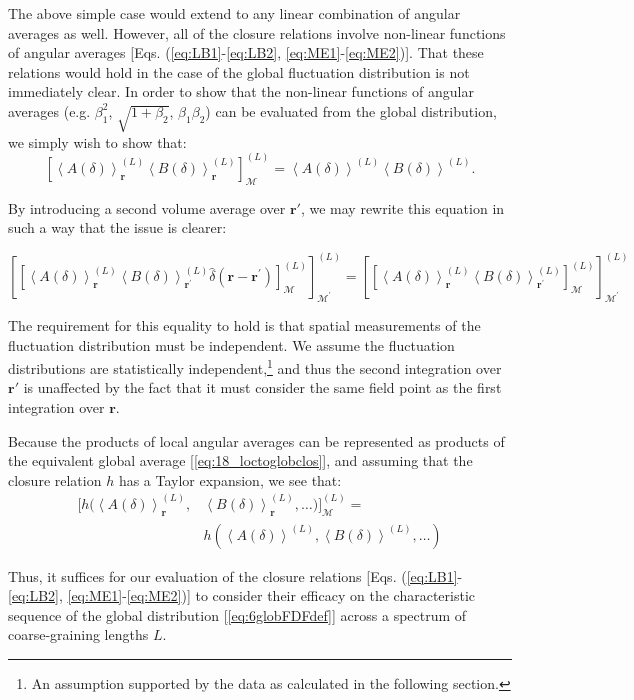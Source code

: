 The above simple case would extend to any linear combination of angular averages as well. However, all of the closure relations involve non-linear functions of angular averages [Eqs. (\ref{eq:LB1}-\ref{eq:LB2}, \ref{eq:ME1}-\ref{eq:ME2})]. That these relations would hold in the case of the global fluctuation distribution is not immediately clear. In order to show that the non-linear functions of angular averages (e.g. \(\beta_{1}^{2}\), \(\sqrt{1 + \beta_{2}}\), \(\beta_{1}\beta_{2}\)) can be evaluated from the global distribution, we simply wish to show that:
\begin{equation}
\left\lbrack \left\langle A(\delta) \right\rangle_{\boldsymbol{r}}^{(L)}\left\langle B(\delta) \right\rangle_{\boldsymbol{r}}^{(L)} \right\rbrack_{\mathcal{M}}^{(L)} = \left\langle A(\delta) \right\rangle^{(L)}\left\langle B(\delta) \right\rangle^{(L)}. \label{eq:18_loctoglobclos}
\end{equation}

By introducing a second volume average over \(\boldsymbol{r}'\), we may rewrite this equation in such a way that the issue is clearer:
\begin{widetext}
\begin{equation}\left\lbrack \left\lbrack \left\langle A(\delta) \right\rangle_{\boldsymbol{r}}^{(L)}\left\langle B(\delta) \right\rangle_{\boldsymbol{r}^{\boldsymbol{'}}}^{(L)}\hat{\delta}\left( \boldsymbol{r -}\boldsymbol{r}^{\boldsymbol{'}} \right) \right\rbrack_{\mathcal{M}}^{(L)} \right\rbrack_{\mathcal{M}^{'}}^{(L)} = \left\lbrack \left\lbrack \left\langle A(\delta) \right\rangle_{\boldsymbol{r}}^{(L)}\left\langle B(\delta) \right\rangle_{\boldsymbol{r}^{\boldsymbol{'}}}^{(L)} \right\rbrack_{\mathcal{M}}^{(L)} \right\rbrack_{\mathcal{M}^{'}}^{(L)}
\end{equation}
\end{widetext}
The requirement for this equality to hold is that spatial measurements
of the fluctuation distribution must be independent. We assume the
fluctuation distributions are statistically independent,\footnote{An
  assumption supported by the data as calculated in the following
  section.} and thus the second integration over \(\boldsymbol{r}'\) is
unaffected by the fact that it must consider the same field point as the
first integration over \(\boldsymbol{r}\).

Because the products of local angular averages can be represented as
products of the equivalent global average [\cref{eq:18_loctoglobclos}], and assuming that the closure relation $h$ has a Taylor expansion, we see that:
\begin{align}\bigg\lbrack h\Big( \left\langle A(\delta) \right\rangle_{\boldsymbol{r}}^{(L)},&\left\langle B(\delta) \right\rangle_{\boldsymbol{r}}^{(L)},\ldots \Big) \bigg\rbrack_{\mathcal{M}}^{(L)} = \nonumber\\
 & h\left( \left\langle A(\delta) \right\rangle^{(L)},\left\langle B(\delta) \right\rangle^{(L)},\ldots \right)
\end{align}

Thus, it suffices for our evaluation of the closure relations [Eqs. (\ref{eq:LB1}-\ref{eq:LB2}, \ref{eq:ME1}-\ref{eq:ME2})] to consider their efficacy on the characteristic sequence of the global distribution [\cref{eq:6globFDFdef}] across a spectrum of coarse-graining lengths \(L\).

